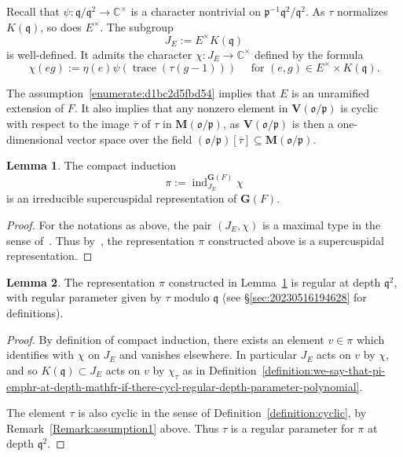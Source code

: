 \documentclass[reqno]{amsart}
\DeclareMathOperator{\trace}{trace}
\DeclareMathOperator{\ind}{ind}
\theoremstyle{plain} \newtheorem{theorem} {Theorem} \newtheorem{conjecture} {Conjecture} \newtheorem{corollary} [theorem] {Corollary} \newtheorem{proposition} [theorem] {Proposition} \newtheorem{fact} [theorem] {Fact}
\theoremstyle{definition} \newtheorem{definition} [theorem] {Definition}
\theoremstyle{itplain} %
\newtheorem{lemma}[theorem]{Lemma}
\newcommand{\mfq}{\mathfrak{q}}
\begin{document}
Recall that $\psi : \mfq / \mfq^2 \rightarrow \mathbb{C}^\times$ is a character nontrivial on $\mathfrak{p} ^{-1} \mfq^2 / \mfq^2$. As $\tau$ normalizes $K(\mfq)$, so does $E^\times$. The subgroup
\begin{equation*}
  J_E := E^\times K(\mfq)
\end{equation*}
is well-defined. It admits the character $\chi : J_E \rightarrow \mathbb{C}^\times$ defined by the formula
\begin{equation}\label{Eq:chi}
  \chi(e g) := \eta(e) \psi(\trace(\tau (g-1))) \quad \text{ for } (e,g) \in E^\times \times K(\mfq).
\end{equation}
\begin{remark}\label{Remark:assumption1}
  The assumption~\eqref{enumerate:d1bc2d5fbd54} implies that $E$ is an unramified extension of $F$. It also implies that any nonzero element in $\mathbf{V}(\mathfrak{o}/\mathfrak{p})$ is cyclic with respect to the image $\overline{\tau}$ of $\tau$ in $\mathbf{M}(\mathfrak{o}/\mathfrak{p})$, as $\mathbf{V}(\mathfrak{o}/\mathfrak{p})$ is then a one-dimensional vector space over the field $(\mathfrak{o}/\mathfrak{p})[\overline{\tau}] \subseteq \mathbf{M}(\mathfrak{o}/\mathfrak{p})$.
\end{remark}
\begin{lemma}\label{lemma:d1bfac67927b}
  The compact induction
  \begin{equation*}
    \pi :=\ind_{J_E}^{\mathbf{G}(F)} \chi
  \end{equation*}
  is an irreducible supercuspidal representation of $\mathbf{G}(F)$.
\end{lemma}
\begin{proof}
  For the notations as above, the pair $(J_E, \chi)$ is a maximal type in the sense of~\cite[(6.2)]{BK}.  Thus by~\cite[(6.2.2)]{BK}, the representation $\pi$ constructed above is a supercuspidal representation.
\end{proof}
\begin{lemma}\label{Lem:supercuspidalregular}
  The representation $\pi$ constructed in Lemma~\ref{lemma:d1bfac67927b} is regular at depth $\mfq^2$, with regular parameter given by $\tau$ modulo $\mathfrak{q}$ (see \S\ref{sec:20230516194628} for definitions).
\end{lemma}
\begin{proof}
  By definition of compact induction, there exists an element $v\in \pi$ which identifies with $\chi$ on $J_E$ and vanishes elsewhere. In particular $J_E$ acts on $v$ by $\chi$, and so $K(\mfq)\subset J_E$ acts on $v$ by $\chi_\tau$ as in Definition~\ref{definition:we-say-that-pi-emphr-at-depth-mathfr-if-there-cycl-regular-depth-parameter-polynomial}.

  The element $\tau$ is also cyclic in the sense of Definition~\ref{definition:cyclic}, by Remark~\ref{Remark:assumption1} above.  Thus $\tau$ is a regular parameter for $\pi$ at depth $\mfq^2$.
\end{proof}
\end{document}
